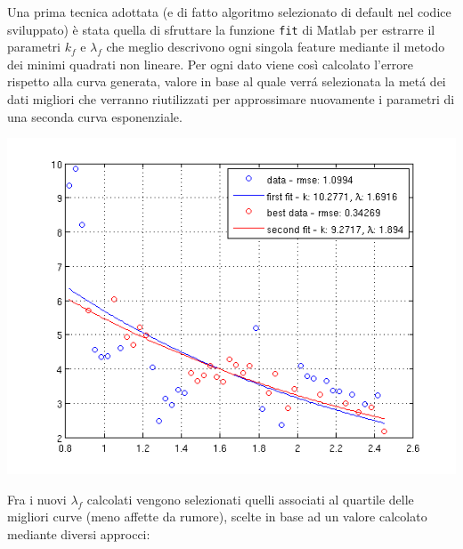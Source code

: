 \documentclass[12pt]{report}
\begin{document}
\noindent Una prima tecnica adottata (e di fatto algoritmo selezionato di default nel codice sviluppato) \`e stata quella di sfruttare la funzione \verb|fit| di Matlab per estrarre il parametri $k_f$ e $\lambda_f$ che meglio descrivono ogni singola feature mediante il metodo dei minimi quadrati non lineare. Per ogni dato viene cos\`i calcolato l'errore rispetto alla curva generata, valore in base al quale verr\'a selezionata la met\'a dei dati migliori che verranno riutilizzati per approssimare nuovamente i parametri di una seconda curva esponenziale.\\

\begin{center}
	\includegraphics[scale=0.7]{images/twoFits.png}
	\label{fig:twoFits}
\end{center}

\noindent Fra i nuovi $\lambda_f$ calcolati vengono selezionati quelli associati al quartile delle migliori curve (meno affette da rumore), scelte in base ad un valore calcolato mediante diversi approcci:
\end{document}
